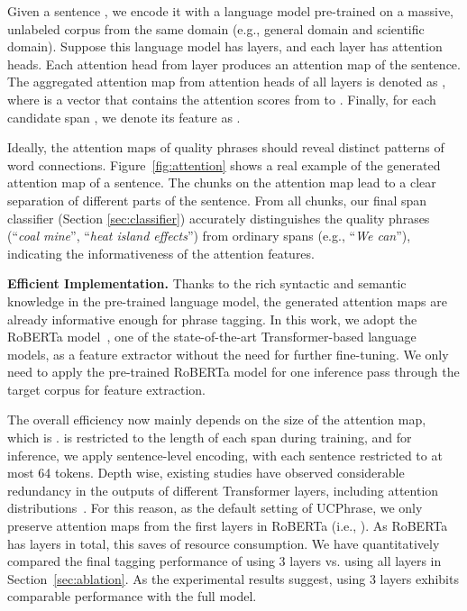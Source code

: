 \documentclass[sigconf]{acmart}
\newcommand{\our}{\mbox{UCPhrase}\xspace}
\newcommand{\eg}{\mbox{e.g.}\xspace}
\newcommand{\example}[1]{``\emph{#1}''}
\newcommand{\tightmath}[1]{\everymath{\medmuskip=1.5mu minus 1.5mu\thickmuskip=2mu minus 2mu}\everymath{\medmuskip=2mu minus 2mu\thickmuskip=4mu minus 4mu}}
\begin{document}
Given a sentence , we encode it with a language model pre-trained on a massive, unlabeled corpus from the same domain (\eg, general domain and scientific domain).
Suppose this language model has  layers, and each layer has  attention heads.
Each attention head  from layer  produces an attention map  of the sentence.
The aggregated attention map from attention heads of all layers is denoted as ,
where  is a vector that contains the attention scores from  to . 
Finally, for each candidate span , we denote its feature as .

Ideally, the attention maps of quality phrases should reveal distinct patterns of word connections.
Figure~\ref{fig:attention} shows a real example of the generated attention map of a sentence.
The chunks on the attention map lead to a clear separation of different parts of the sentence.
From all chunks, our final span classifier (Section \ref{sec:classifier}) accurately distinguishes the quality phrases (\example{coal mine}, \example{heat island effects}) from ordinary spans (\eg, \example{We can}), indicating the informativeness of the attention features.


\noindent\textbf{Efficient Implementation.}
Thanks to the rich syntactic and semantic knowledge in the pre-trained language model, the generated attention maps are already informative enough for phrase tagging.
In this work, we adopt the RoBERTa model~\cite{liu2019roberta}, one of the state-of-the-art Transformer-based language models, as a feature extractor without the need for further fine-tuning.
We only need to apply the pre-trained RoBERTa model for one inference pass through the target corpus for feature extraction.

The overall efficiency now mainly depends on the size of the attention map, which is \tightmath{N \times N \times (H \cdot L)}.
 is restricted to the length of each span during training, and for inference, we apply sentence-level encoding, with each sentence restricted to at most 64 tokens.
Depth wise, existing studies have observed considerable redundancy in the outputs of different Transformer layers, including attention distributions~\cite{gong2019efficient,gu2020transformer}.
For this reason, as the default setting of \our, we only preserve attention maps from the first  layers in RoBERTa (i.e., ).
As RoBERTa has  layers in total, this saves  of resource consumption.
We have quantitatively compared the final tagging performance of using 3 layers vs. using all  layers in Section~\ref{sec:ablation}.
As the experimental results suggest, using 3 layers exhibits comparable performance with the full model.
\end{document}
